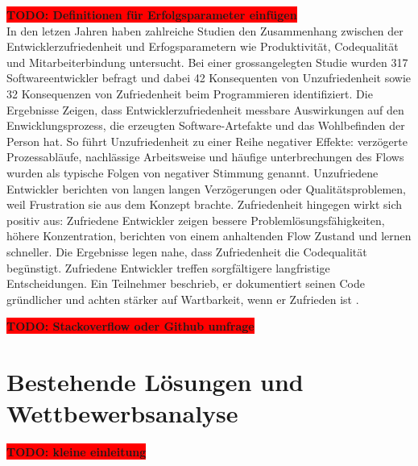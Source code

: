 \documentclass[12pt,a4paper]{report}
\newcommand{\todo}[1]{\colorbox{red}{\textbf{TODO: #1}}\\}
\begin{document}
\todo{Definitionen für Erfolgsparameter einfügen}
In den letzen Jahren haben zahlreiche Studien den Zusammenhang zwischen der Entwicklerzufriedenheit und Erfogsparametern wie 
Produktivität, Codequalität und Mitarbeiterbindung untersucht. Bei einer grossangelegten Studie wurden 317 Softwareentwickler
befragt und dabei 42 Konsequenten von Unzufriedenheit sowie 32 Konsequenzen von Zufriedenheit beim Programmieren identifiziert.
Die Ergebnisse Zeigen, dass Entwicklerzufriedenheit messbare Auswirkungen auf den Enwicklungsprozess, die erzeugten 
Software-Artefakte und das Wohlbefinden der Person hat. So führt Unzufriedenheit zu einer Reihe negativer Effekte: verzögerte
Prozessabläufe, nachlässige Arbeitsweise und häufige unterbrechungen des Flows wurden als typische Folgen von negativer Stimmung
genannt. Unzufriedene Entwickler berichten von langen langen Verzögerungen oder Qualitätsproblemen, weil Frustration sie aus dem
Konzept brachte. Zufriedenheit hingegen wirkt sich positiv aus: Zufriedene Entwickler zeigen bessere Problemlösungsfähigkeiten,
höhere Konzentration, berichten von einem anhaltenden Flow Zustand und lernen schneller. Die Ergebnisse legen nahe, dass 
Zufriedenheit die Codequalität begünstigt. Zufriedene Entwickler treffen sorgfältigere langfristige Entscheidungen. Ein Teilnehmer
beschrieb, er dokumentiert seinen Code gründlicher und achten stärker auf Wartbarkeit, wenn er Zufrieden ist 
\cite{graziotin_what_2018}.

\todo{Stackoverflow oder Github umfrage}

\section{Bestehende Lösungen und Wettbewerbsanalyse}

\todo{kleine einleitung}
\end{document}
